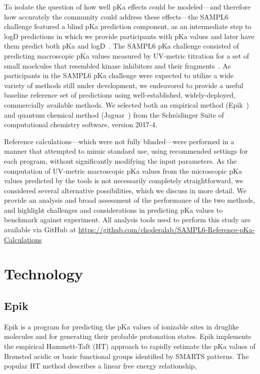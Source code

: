 \documentclass[9pt,lineno,final]{elife}
\begin{document}
To isolate the question of how well pKa effects could be modeled---and therefore how accurately the community could address these effects---the SAMPL6 challenge featured a blind pKa prediction component, as an intermediate step to logD predictions in which we provide participants with pKa values and later have them predict both pKa and logD~\cite{sampl6-pKa-measurements}.
The SAMPL6 pKa challenge consisted of predicting macroscopic pKa values measured by UV-metric titration for a set of small moelcules that resembled kinase inhibitors and their fragments~\cite{sampl6-pKa-measurements}.
As participants in the SAMPL6 pKa challenge were expected to utilize a wide variety of methods still under development, we endeavored to provide a useful baseline reference set of predictions using well-established, widely-deployed, commercially available methods.
We selected both an empirical method (Epik~\cite{Shelley2007Epik}) and quantum chemical method (Jaguar~\cite{Bochevarov2013}) from the Schr\"{o}dinger Suite of computational chemistry software, version 2017-4.

Reference calculations---which were not fully blinded---were performed in a manner that attempted to mimic standard use, using recommended settings for each program, without significantly modifying the input parameters.
As the computation of UV-metric macroscopic pKa values from the microscopic pKa values predicted by the tools is not necessarily completely straightforward, we considered several alternative possibilities, which we discuss in more detail.
We provide an analysis and broad assessment of the performance of the two methods, and highlight challenges and considerations in predicting pKa values to benchmark against experiment.
All analysis tools used to perform this study are available via GitHub at
\url{https://github.com/choderalab/SAMPL6-Reference-pKa-Calculations}

\section{Technology}


\subsection{Epik}

Epik\cite{Shelley2007Epik} is a program for predicting the pKa values of ionizable sites in druglike molecules and for generating their probable protonation states. Epik implements the empirical Hammett-Taft (HT) approach \cite{Perrin1981HammettTaft}  to rapidly estimate the pKa values of Brønsted acidic or basic functional groups identified by SMARTS \cite{SMARTSDaylight} patterns. The popular HT method describes a linear free energy relationship,
\end{document}
